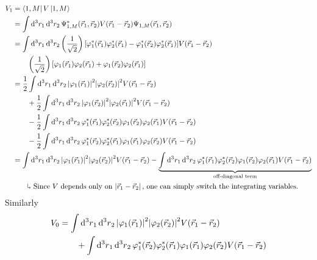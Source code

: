 \documentclass[12pt,a4paper,titlepage]{article}
\newcommand{\trm}[1]{\textrm{#1}} %
\newcommand{\explain}{\quad\rotatebox[origin=c]{180}{$\Lsh$}} %
\begin{document}
\begin{equation}
\begin{aligned}
V_{1}&=\bra{1,M}V\ket{1,M}\\
&=\int\dd[3]{r_{1}}\dd[3]{r_{2}}\Psi^{*}_{1,M}(\vec{r}_{1},\vec{r}_{2})V(\vec{r}_{1}-\vec{r}_{2})\Psi_{1,M}(\vec{r}_{1},\vec{r}_{2})\\
&=\int\dd[3]{r_{1}}\dd[3]{r_{2}}\left(\frac{1}{\sqrt{2}}\right)[\varphi_{1}^{*}(\vec{r}_{1})\varphi_{2}^{*}(\vec{r}_{1})-\varphi_{1}^{*}(\vec{r}_{2})\varphi_{2}^{*}(\vec{r}_{1})]V(\vec{r}_{1}-\vec{r}_{2})\\
&\qquad\left(\frac{1}{\sqrt{2}}\right)[\varphi_{1}(\vec{r}_{1})\varphi_{2}(\vec{r}_{1})+\varphi_{1}(\vec{r}_{2})\varphi_{2}(\vec{r}_{1})]\\
&=\frac{1}{2}\int\dd[3]{r_{1}}\dd[3]{r_{2}}\abs{\varphi_{1}(\vec{r}_{1})}^{2}\abs{\varphi_{2}(\vec{r}_{2})}^{2}V(\vec{r}_{1}-\vec{r}_{2})\\
&\qquad+\frac{1}{2}\int\dd[3]{r_{1}}\dd[3]{r_{2}}\abs{\varphi_{1}(\vec{r}_{2})}^{2}\abs{\varphi_{2}(\vec{r}_{1})}^{2}V(\vec{r}_{1}-\vec{r}_{2})\\
&\qquad-\frac{1}{2}\int\dd[3]{r_{1}}\dd[3]{r_{2}}\varphi_{1}^{*}(\vec{r}_{1})\varphi_{2}^{*}(\vec{r}_{2})\varphi_{1}(\vec{r}_{2})\varphi_{2}(\vec{r}_{1})V(\vec{r}_{1}-\vec{r}_{2})\\
&\qquad-\frac{1}{2}\int\dd[3]{r_{1}}\dd[3]{r_{2}}\varphi_{1}^{*}(\vec{r}_{2})\varphi_{2}^{*}(\vec{r}_{1})\varphi_{1}(\vec{r}_{1})\varphi_{2}(\vec{r}_{2})V(\vec{r}_{1}-\vec{r}_{2})\\
&=\int\dd[3]{r_{1}}\dd[3]{r_{2}}\abs{\varphi_{1}(\vec{r}_{1})}^{2}\abs{\varphi_{2}(\vec{r}_{2})}^{2}V(\vec{r}_{1}-\vec{r}_{2})-\underbrace{\int\dd[3]{r_{1}}\dd[3]{r_{2}}\varphi_{1}^{*}(\vec{r}_{1})\varphi_{2}^{*}(\vec{r}_{2})\varphi_{1}(\vec{r}_{2})\varphi_{2}(\vec{r}_{1})V(\vec{r}_{1}-\vec{r}_{2})}_{\trm{off-diagonal term}}\\
&\quad\explain\trm{ Since $V$ depends only on $\abs*{\vec{r}_{1}-\vec{r}_{2}}$, one can simply switch the integrating variables.}
\end{aligned}
\end{equation}
Similarly
\begin{equation}
\begin{aligned}
V_{0}&=\int\dd[3]{r}_{1}\dd[3]{r}_{2}\abs{\varphi_{1}(\vec{r}_{1})}^{2}\abs{\varphi_{2}(\vec{r}_{2})}^{2}V(\vec{r}_{1}-\vec{r}_{2})\\
&\qquad+\int\dd[3]{r}_{1}\dd[3]{r}_{2}\varphi_{1}^{*}(\vec{r}_{2})\varphi_{2}^{*}(\vec{r}_{1})\varphi_{1}(\vec{r}_{1})\varphi_{2}(\vec{r}_{2})V(\vec{r}_{1}-\vec{r}_{2})
\end{aligned}
\end{equation}
\end{document}
